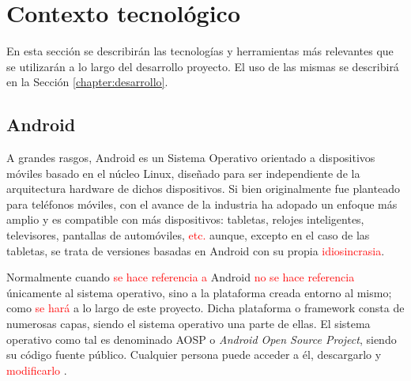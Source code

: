 %
%
%
%




\section{Contexto tecnológico}

    En esta sección se describirán las tecnologías y herramientas más relevantes que se utilizarán a lo
    largo del desarrollo proyecto. El uso de las mismas se describirá en la Sección \ref{chapter:desarrollo}.
       
    \subsection{Android}

        A grandes rasgos, Android es un Sistema Operativo orientado a dispositivos móviles basado en el núcleo 
        Linux, diseñado para ser independiente de la arquitectura hardware de dichos dispositivos. 
        Si bien originalmente fue planteado para teléfonos móviles, con el avance de la industria ha adopado 
        un enfoque más amplio y es compatible con más dispositivos: tabletas, relojes inteligentes, televisores, 
        pantallas de automóviles, \textcolor{red}{etc.} %
        aunque, excepto en el caso de las tabletas, se trata de versiones basadas en
        Android con su propia %
        \textcolor{red}{idiosincrasia}. 

        Normalmente cuando \textcolor{red}{se hace referencia a} %
        Android \textcolor{red}{no se hace referencia} %
        únicamente al sistema operativo, sino a la
        plataforma creada entorno al mismo; como \textcolor{red}{se hará} %
        a lo largo de este proyecto. Dicha plataforma o 
        \gls{framework} consta de numerosas capas, siendo el sistema operativo una parte de ellas. El sistema 
        operativo como tal es denominado AOSP o \textit{Android Open Source Project}, siendo su código fuente 
        público. Cualquier persona puede acceder a él, descargarlo y \textcolor{red}{modificarlo} %
        \cite{collado_que_2022}.

